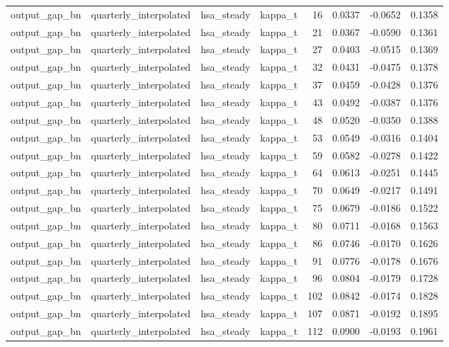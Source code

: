\begin{tabular}{llllrrrr}
output\_gap\_bn & quarterly\_interpolated & hsa\_steady & kappa\_t & 16 & 0.0337 & -0.0652 & 0.1358 \\
output\_gap\_bn & quarterly\_interpolated & hsa\_steady & kappa\_t & 21 & 0.0367 & -0.0590 & 0.1361 \\
output\_gap\_bn & quarterly\_interpolated & hsa\_steady & kappa\_t & 27 & 0.0403 & -0.0515 & 0.1369 \\
output\_gap\_bn & quarterly\_interpolated & hsa\_steady & kappa\_t & 32 & 0.0431 & -0.0475 & 0.1378 \\
output\_gap\_bn & quarterly\_interpolated & hsa\_steady & kappa\_t & 37 & 0.0459 & -0.0428 & 0.1376 \\
output\_gap\_bn & quarterly\_interpolated & hsa\_steady & kappa\_t & 43 & 0.0492 & -0.0387 & 0.1376 \\
output\_gap\_bn & quarterly\_interpolated & hsa\_steady & kappa\_t & 48 & 0.0520 & -0.0350 & 0.1388 \\
output\_gap\_bn & quarterly\_interpolated & hsa\_steady & kappa\_t & 53 & 0.0549 & -0.0316 & 0.1404 \\
output\_gap\_bn & quarterly\_interpolated & hsa\_steady & kappa\_t & 59 & 0.0582 & -0.0278 & 0.1422 \\
output\_gap\_bn & quarterly\_interpolated & hsa\_steady & kappa\_t & 64 & 0.0613 & -0.0251 & 0.1445 \\
output\_gap\_bn & quarterly\_interpolated & hsa\_steady & kappa\_t & 70 & 0.0649 & -0.0217 & 0.1491 \\
output\_gap\_bn & quarterly\_interpolated & hsa\_steady & kappa\_t & 75 & 0.0679 & -0.0186 & 0.1522 \\
output\_gap\_bn & quarterly\_interpolated & hsa\_steady & kappa\_t & 80 & 0.0711 & -0.0168 & 0.1563 \\
output\_gap\_bn & quarterly\_interpolated & hsa\_steady & kappa\_t & 86 & 0.0746 & -0.0170 & 0.1626 \\
output\_gap\_bn & quarterly\_interpolated & hsa\_steady & kappa\_t & 91 & 0.0776 & -0.0178 & 0.1676 \\
output\_gap\_bn & quarterly\_interpolated & hsa\_steady & kappa\_t & 96 & 0.0804 & -0.0179 & 0.1728 \\
output\_gap\_bn & quarterly\_interpolated & hsa\_steady & kappa\_t & 102 & 0.0842 & -0.0174 & 0.1828 \\
output\_gap\_bn & quarterly\_interpolated & hsa\_steady & kappa\_t & 107 & 0.0871 & -0.0192 & 0.1895 \\
output\_gap\_bn & quarterly\_interpolated & hsa\_steady & kappa\_t & 112 & 0.0900 & -0.0193 & 0.1961 \\

\end{tabular}
